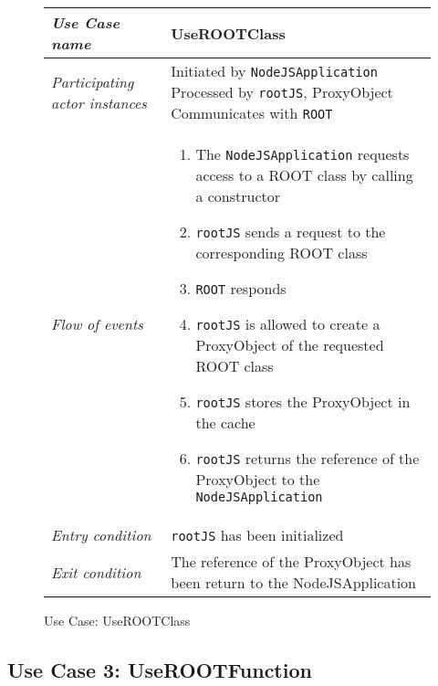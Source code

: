 \begin{figure}[htb]
	\centering
	\begin{longtable}{p{3cm} @{\hskip 1cm} p{12cm}}
		\hline
		
		\textit{Use Case name} & UseROOTClass\\
		\hline
		
		\textit{Participating actor instances} & Initiated by \texttt{NodeJSApplication}
                Processed by \texttt{rootJS}, ProxyObject
                Communicates with \texttt{ROOT}\\
		\hline
		
		\textit{Flow of events} &
			\begin{enumerate}
				\item The \texttt{NodeJSApplication}  requests access to a ROOT class by calling a constructor
				\item \texttt{rootJS} sends a request to the corresponding ROOT class
				\item \texttt{ROOT}  responds
				\item \texttt{rootJS} is allowed to create a ProxyObject of the requested
				ROOT class
				\item \texttt{rootJS} stores the ProxyObject in the cache
				\item \texttt{rootJS} returns the reference of the ProxyObject to the 
				\texttt{NodeJSApplication}
			\end{enumerate}
			\\
		\hline
		
		\textit{Entry condition} & \texttt{rootJS} has been initialized\\
		\hline
		
		\textit{Exit condition} & The reference of the ProxyObject has been return to the NodeJSApplication\\
        \hline
	\end{longtable}
	
	\caption{Use Case: UseROOTClass}
\end{figure}
\pagebreak
\subsection{Use Case 3: UseROOTFunction}


